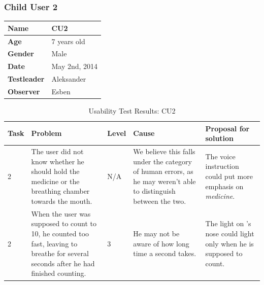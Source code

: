 \subsubsection{Child User 2}
\begin{table}[H]
\centering
\begin{tabular}{| p{4.0cm} | p{4.0cm} |}
\hline
 \textbf{Name} & CU2 \\
 \hline
 \textbf{Age} & 7 years old \\
 \hline 
 \textbf{Gender} & Male \\
 \hline
 \textbf{Date} & May 2nd, 2014 \\
 \hline
 \textbf{Testleader} & Aleksander \\
 \hline
 \textbf{Observer} & Esben \\
 \hline
\end{tabular}
\end{table}

\begin{table}[H]
\centering
\begin{tabular}{| p{1.0cm} | p{4.0cm} | p{0.9cm} | p{3.1cm} | p{3.7cm} |}
\hline
	\textbf{Task} & \textbf{Problem} & \textbf{Level} & \textbf{Cause} & \textbf{Proposal for solution} \\
	\hline
	2 & The user did not know whether he should hold the medicine or the breathing chamber towards the mouth. & N/A & We believe this falls under the category of human errors, as he may weren't able to distinguish between the two. & The voice instruction could put more emphasis on \emph{medicine}. \\
	\hline
	2 & When the user was supposed to count to 10, he counted too fast, leaving \ab{} to breathe for several seconds after he had finished counting. & 3 & He may not be aware of how long time a second takes. & The light on \ab{}'s nose could light only when he is supposed to count. \\
	\hline
\end{tabular}
\caption{Usability Test Results: CU2}
\label{tab:testchild2}
\end{table}

